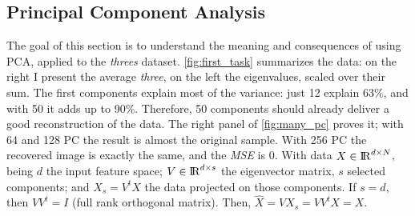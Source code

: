 \documentclass[a4paper, 10pt]{article}
\begin{document}
  \subsection{Principal Component Analysis}
  The goal of this section is to understand the meaning and consequences of using
  PCA, applied to the \emph{threes} dataset. \autoref{fig:first_task} summarizes the data:
  on the right I present the average \emph{three}, on the left the eigenvalues, 
  scaled over their sum. The first components explain most of the variance:
  just 12 explain 63\%, and with 50 it adds up to 90\%. Therefore, 50 components 
  should already deliver a good reconstruction of the data. The right panel
  of \autoref{fig:many_pc} proves it; with 64 and 128 PC the result
  is almost the original sample. With 256 PC the recovered image is exactly
  the same, and the \emph{MSE} is 0. With data $X \in {\rm I\!R}^{d \times N}$,
  being $d$ the input feature space; $V \in {\rm I\!R}^{d \times s}$ the
  eigenvector matrix, $s$ selected components; and $X_s=V^{t}X$ the data
  projected on those components. If $s=d$, then $VV^{t}=I$ (full rank orthogonal matrix).
  Then, $\hat{X} = VX_s = VV^{t}X = X$. 
  
\end{document}
